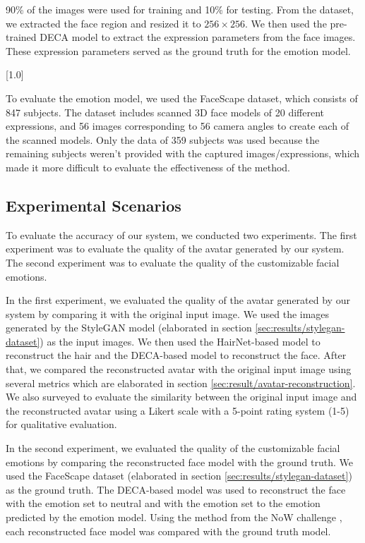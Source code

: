 90\% of the images were used for training and 10\% for testing. From the dataset, we extracted the face region and resized it to $256\times256$. We then used the pre-trained DECA model to extract the expression parameters from the face images. These expression parameters served as the ground truth for the emotion model.

[1.0]

To evaluate the emotion model, we used the FaceScape dataset, which consists of 847 subjects. The dataset includes scanned 3D face models of 20 different expressions, and 56 images corresponding to 56 camera angles to create each of the scanned models. Only the data of 359 subjects was used because the remaining subjects weren't provided with the captured images/expressions, which made it more difficult to evaluate the effectiveness of the method.


\subsection{Experimental Scenarios}
To evaluate the accuracy of our system, we conducted two experiments. The first experiment was to evaluate the quality of the avatar generated by our system. The second experiment was to evaluate the quality of the customizable facial emotions.

In the first experiment, we evaluated the quality of the avatar generated by our system by comparing it with the original input image. We used the images generated by the StyleGAN model (elaborated in section \ref{sec:results/stylegan-dataset}) as the input images. We then used the HairNet-based model to reconstruct the hair and the DECA-based model to reconstruct the face. After that, we compared the reconstructed avatar with the original input image using several metrics which are elaborated in section \ref{sec:result/avatar-reconstruction}. We also surveyed to evaluate the similarity between the original input image and the reconstructed avatar using a Likert scale with a 5-point rating system (1-5) for qualitative evaluation.

In the second experiment, we evaluated the quality of the customizable facial emotions by comparing the reconstructed face model with the ground truth. We used the FaceScape dataset (elaborated in section \ref{sec:results/stylegan-dataset}) as the ground truth. The DECA-based model was used to reconstruct the face with the emotion set to neutral and with the emotion set to the emotion predicted by the emotion model. Using the method from the NoW challenge \cite{RingNet:CVPR:2019}, each reconstructed face model was compared with the ground truth model.


